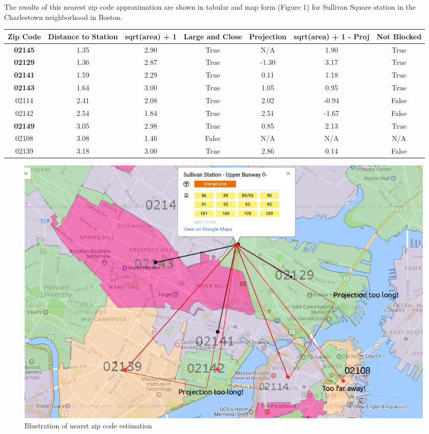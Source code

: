 \documentclass{article}
\begin{document}
The results of this nearest zip code approximation are shown in tabular and map form (Figure 1) for Sullivan Square station in the Charlestown neighborhood in Boston.

\begin{center}
\begin{tabular}{ c c c c c c c }
\hline
Zip Code & Distance to Station & sqrt(area) + 1& Large and Close & Projection & sqrt(area) + 1 - Proj & Not Blocked \\
\hline
\bf{02145} & 1.35 & 2.90 & True & N/A & 1.90 & True \\
\bf{02129} & 1.36 & 2.87 & True & -1.30 & 3.17 & True \\
\bf{02141} & 1.59 & 2.29 & True & 0.11 & 1.18 & True \\
\bf{02143} & 1.64 & 3.00 & True & 1.05 & 0.95 & True \\
02114 & 2.41 & 2.08 & True & 2.02 & -0.94 & False \\
02142 & 2.54 & 1.84 & True & 2.51 & -1.67 & False \\
\bf{02149} & 3.05 & 2.98 & True & 0.85 & 2.13 & True \\
02108 & 3.08 & 1.46 & False & N/A & N/A & N/A \\ 
02139 & 3.18 & 3.00 & True & 2.86 & 0.14 & False \\
\hline
\end{tabular}
\end{center}

\begin{figure}[H]\label{fig:f1}
\begin{center}\includegraphics[scale=0.6]{Sullivan_for_distance_with_markup}\end{center}\caption{Illustration of nearst zip code estimation}
\end{figure}
\end{document}
